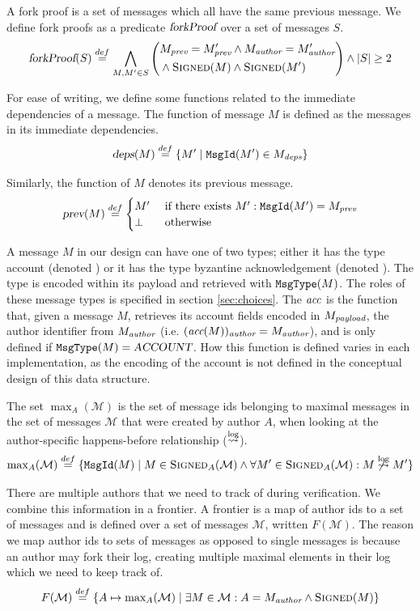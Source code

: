 A fork proof is a set of messages which all have the same previous message. We define fork proofs as a predicate $\textsl{forkProof}$ over a set of messages $S$.
\[
    \textsl{forkProof}(S) \stackrel{def}{=}
    \bigwedge_{M, M' \in S} \left(
        \begin{aligned}
            &M_\emph{prev} = M'_\emph{prev}
            \land M_\emph{author} = M'_\emph{author} \\
            &\land \textsc{Signed}(M)
            \land \textsc{Signed}(M')
        \end{aligned}
    \right) \land \lvert S \rvert \ge 2
\]

For ease of writing, we define some functions related to the immediate dependencies of a message.
The function  of message $M$ is defined as the messages in its immediate dependencies.
\[\textsl{deps}(M) \stackrel{def}{=} \{M' \mid \texttt{MsgId}(M') \in M_\emph{deps}\}\]

Similarly, the function  of $M$ denotes its previous message.
\[\textsl{prev}(M) \stackrel{def}{=} \begin{cases}
    M' &\text{ if there exists } M' : \texttt{MsgId}(M') = M_\emph{prev}\\
    \bot & \text{ otherwise}
\end{cases} \]

A message $M$ in our design can have one of two types; either it has the type account (denoted ) or it has the type byzantine acknowledgement (denoted ). The type is encoded within its payload and retrieved with $\texttt{MsgType}(M)$. The roles of these message types is specified in section \ref{sec:choices}. The $\textit{acc}$ is the function that, given a message $M$, retrieves its account fields encoded in $M_\emph{payload}$, the author identifier from $M_\emph{author}$ (i.e. $(\textit{acc}(M))_\emph{author} = M_\emph{author}$), and is only defined if $\texttt{MsgType}(M) = \textsl{ACCOUNT}$. How this function is defined varies in each implementation, as the encoding of the account is not defined in the conceptual design of this data structure.

The set $\max_A(\mathcal M)$ is the set of message ids belonging to maximal messages in the set of messages $\mathcal M$ that were created by author $A$, when looking at the author-specific happens-before relationship ($\stackrel{\text{log}}{\rightsquigarrow}$).
\[
    \text{max}_A(\mathcal M) \stackrel{def}{=} \{\texttt{MsgId}(M) \mid M \in \textsc{Signed}_A(\mathcal M) \land \forall M' \in \textsc{Signed}_A(\mathcal M) : M \not\stackrel{\text{log}}{\rightsquigarrow} M'\}
\]

There are multiple authors that we need to track of during verification. We combine this information in a frontier. A frontier is a map of author ids to a set of messages and is defined over a set of messages $\mathcal M$, written $F(\mathcal M)$. The reason we map author ids to sets of messages as opposed to single messages is because an author may fork their log, creating multiple maximal elements in their log which we need to keep track of.
\begin{equation}
    \label{eqn:frontier}
    F(\mathcal M) \stackrel{def}{=} \{A \mapsto \text{max}_A(\mathcal M) \mid \exists M \in \mathcal M : A = M_\emph{author} \land \textsc{Signed}(M)\}
\end{equation}

